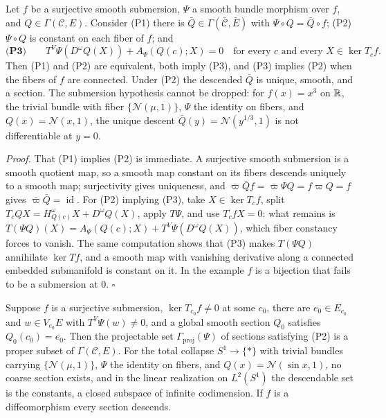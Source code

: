 Let \(f\) be a surjective smooth submersion, \(\Psi\) a smooth bundle morphism over \(f\), and
\(Q\in\Gamma(\mathcal C,E)\). Consider (P1) there is \(\bar Q\in\Gamma(\bar{\mathcal C},\bar E)\) with
\(\Psi\circ Q=\bar Q\circ f\); (P2) \(\Psi\circ Q\) is constant on each fiber of \(f\); and
\begin{equation}
\textbf{(P3)}\qquad
T^V\Psi\left(D^\omega Q(X)\right)+A_\Psi\left(Q(c);X\right)=0
\quad\text{for every }c\text{ and every }X\in\ker T_cf.
\label{eq:pb-projectability-criterion}
\end{equation}
Then (P1) and (P2) are equivalent, both imply (P3), and (P3) implies (P2) when the fibers of \(f\)
are connected. Under (P2) the descended \(\bar Q\) is unique, smooth, and a section. The submersion
hypothesis cannot be dropped: for \(f(x)=x^3\) on \(\mathbb R\), the trivial bundle with fiber
\(\{\mathcal N(\mu,1)\}\), \(\Psi\) the identity on fibers, and \(Q(x)=\mathcal N(x,1)\), the unique
descent \(\bar Q(y)=\mathcal N(y^{1/3},1)\) is not differentiable at \(y=0\). 

\noindent\emph{Proof.}
That (P1) implies (P2) is immediate. A surjective smooth submersion is a smooth quotient map, so a
smooth map constant on its fibers descends uniquely to a smooth map; surjectivity gives uniqueness,
and \(\bar\varpi\bar Qf=\bar\varpi\Psi Q=f\varpi Q=f\) gives \(\bar\varpi\bar Q=\operatorname{id}\).
For (P2) implying (P3), take \(X\in\ker T_cf\), split \(T_cQX=H^\omega_{Q(c)}X+D^\omega Q(X)\), apply
\(T\Psi\), and use \(T_cfX=0\): what remains is
\(T(\Psi Q)(X)=A_\Psi(Q(c);X)+T^V\Psi(D^\omega Q(X))\), which fiber constancy forces to vanish. The
same computation shows that (P3) makes \(T(\Psi Q)\) annihilate \(\ker Tf\), and a smooth map with
vanishing derivative along a connected embedded submanifold is constant on it. In the example
\(f\) is a bijection that fails to be a submersion at \(0\). \hfill$\square$

Suppose \(f\) is a surjective submersion, \(\ker T_{c_0}f\ne0\) at some \(c_0\), there are
\(e_0\in E_{c_0}\) and \(w\in V_{e_0}E\) with \(T^V\Psi(w)\ne0\), and a global smooth section
\(Q_0\) satisfies \(Q_0(c_0)=e_0\). Then the projectable set \(\Gamma_{\mathrm{proj}}(\Psi)\) of
sections satisfying (P2) is a proper subset of \(\Gamma(\mathcal C,E)\). For the total collapse
\(S^1\to\{\ast\}\) with trivial bundles carrying \(\{\mathcal N(\mu,1)\}\), \(\Psi\) the identity on
fibers, and \(Q(x)=\mathcal N(\sin x,1)\), no coarse section exists, and in the linear realization on
\(L^2(S^1)\) the descendable set is the constants, a closed subspace of infinite codimension. If
\(f\) is a diffeomorphism every section descends. 

